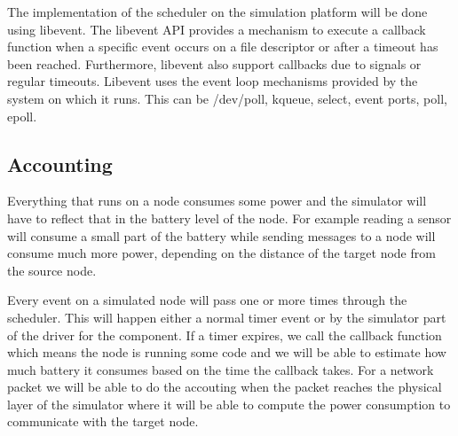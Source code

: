 The implementation of the scheduler on the simulation platform will be done
using libevent. The libevent API provides a mechanism to execute a callback
function when a specific event occurs on a file descriptor or after a timeout
has been reached. Furthermore, libevent also support callbacks due to signals
or regular timeouts. Libevent uses the event loop mechanisms provided by the
system on which it runs. This can be /dev/poll, kqueue, select, event ports,
poll, epoll.

\subsection{Accounting}

Everything that runs on a node consumes some power and the simulator will have
to reflect that in the battery level of the node. For example reading a sensor
will consume a small part of the battery while sending messages to a node will
consume much more power, depending on the distance of the target node from the
source node.

Every event on a simulated node will pass one or more times through the
scheduler. This will happen either a normal timer event or by the simulator
part of the driver for the component. If a timer expires, we call the callback
function which means the node is running some code and we will be able to
estimate how much battery it consumes based on the time the callback takes.
For a network packet we will be able to do the accouting when the packet
reaches the physical layer of the simulator where it will be able to compute
the power consumption to communicate with the target node.
